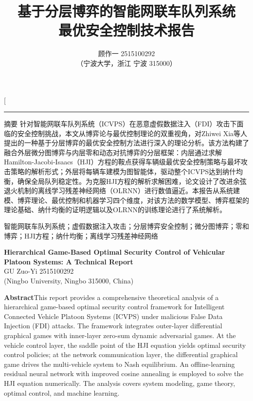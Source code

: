 \documentclass[10.5pt,a4paper,twoside,twocolumn]{ctexart}
\title{\heiti\zihao{2} 基于分层博弈的智能网联车队列系统\\最优安全控制技术报告}
\author{\fangsong\zihao{3} 顾作一 2515100292\\\zihao{6}（宁波大学，浙江 宁波 315000）}
\date{}
\begin{document}
\twocolumn[
\maketitle

\vspace{-6mm}
\noindent\rule{\textwidth}{0.4pt}

\vspace{2mm}
{\heiti{} 摘\quad 要}\quad
{}
针对智能网联车队列系统（ICVPS）在恶意虚假数据注入（FDI）攻击下面临的安全控制挑战，本文从博弈论与最优控制理论的双重视角，对Zhiwei Xia等人提出的一种基于分层博弈的最优安全控制方法进行深入的理论分析。该方法构建了融合外层微分图博弈与内层零和动态对抗博弈的分层框架：内层通过求解Hamilton-Jacobi-Isaacs（HJI）方程的鞍点获得车辆级最优安全控制策略与最坏攻击策略的解析形式；外层将每辆车建模为图智能体，驱动整个ICVPS达到纳什均衡，确保全局队列稳定性。为克服HJI方程的解析求解困难，论文设计了改进余弦退火机制的离线学习残差神经网络（OLRNN）进行数值逼近。本报告从系统建模、博弈理论、最优控制和机器学习四个维度，对该方法的数学模型、博弈框架的理论基础、纳什均衡的证明逻辑以及OLRNN的训练理论进行了系统解析。

\vspace{3mm}
\quad {} 智能网联车队列系统；虚假数据注入攻击；分层博弈安全控制；微分图博弈；零和博弈；HJI方程；纳什均衡；离线学习残差神经网络

\vspace{3mm}
\begin{center}
\textbf{Hierarchical Game-Based Optimal Security Control of Vehicular Platoon Systems: A Technical Report}\\
\vspace{2mm}
 GU Zuo-Yi 2515100292\\
 (Ningbo University, Ningbo 315000, China)
\end{center}

\noindent\textbf{Abstract}\quad This report provides a comprehensive theoretical analysis of a hierarchical game-based optimal security control framework for Intelligent Connected Vehicle Platoon Systems (ICVPS) under malicious False Data Injection (FDI) attacks. The framework integrates outer-layer differential graphical games with inner-layer zero-sum dynamic adversarial games. At the vehicle control layer, the saddle point of the HJI equation yields optimal security control policies; at the network communication layer, the differential graphical game drives the multi-vehicle system to Nash equilibrium. An offline-learning residual neural network with improved cosine annealing is employed to solve the HJI equation numerically. The analysis covers system modeling, game theory, optimal control, and machine learning.
\end{document}
